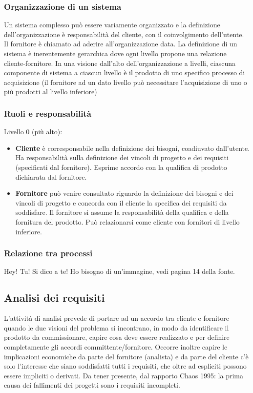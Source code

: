 \subsubsection{Organizzazione di un sistema}
Un sistema complesso può essere variamente organizzato e la definizione dell'organizzazione è responsabilità del cliente, con il coinvolgimento dell'utente. 
Il fornitore è chiamato ad aderire all'organizzazione data. La definizione di un sistema è inerentemente gerarchica dove ogni livello propone una relazione cliente-fornitore.
In una visione dall'alto dell'organizzazione a livelli, ciascuna componente di sistema a ciascun livello è il prodotto di uno specifico processo di acquisizione (il fornitore ad un dato livello può necessitare l'acquisizione di uno o più prodotti al livello inferiore)

\subsubsection{Ruoli e responsabilità}
Livello 0 (più alto):
\begin{itemize}
\item \textbf{Cliente} è corresponsabile nella definizione dei bisogni, coadiuvato dall'utente. Ha responsabilità sulla definizione dei vincoli di progetto e dei requisiti (specificati dal fornitore). Esprime accordo con la qualifica di prodotto dichiarata dal fornitore.
\item \textbf{Fornitore} può venire consultato riguardo la definizione dei bisogni e dei vincoli di progetto e concorda con il cliente la specifica dei requisiti da soddisfare. Il fornitore si assume la responsabilità della qualifica e della fornitura del prodotto. Può relazionarsi come cliente con fornitori di livello inferiore.
\end{itemize}

\subsubsection{Relazione tra processi}
Hey! Tu! Si dico a te! Ho bisogno di un'immagine, vedi pagina 14 della fonte.

\subsection{Analisi dei requisiti}
L'attività di analisi prevede di portare ad un accordo tra cliente e fornitore quando le due visioni del problema si incontrano, in modo da identificare il prodotto da commissionare, capire cosa deve essere realizzato e per definire completamente gli accordi committente/fornitore.
Occorre inoltre capire le implicazioni economiche da parte del fornitore (analista) e da parte del cliente c'è solo l'interesse che siano soddisfatti tutti i requisiti, che oltre ad espliciti possono essere impliciti o derivati. 
Da tener presente, dal rapporto Chaos 1995: la prima causa dei fallimenti dei progetti sono i requisiti incompleti.

